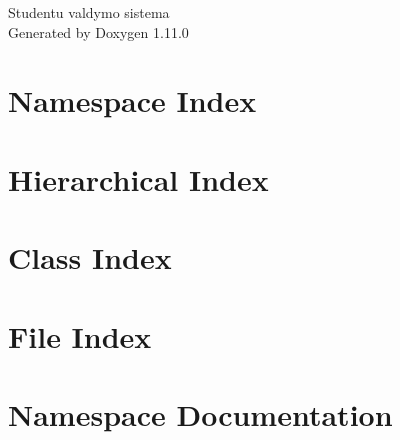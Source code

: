 \documentclass[twoside]{book}
\newcommand{\+}{\discretionary{\mbox{\scriptsize$\hookleftarrow$}}{}{}}
\newcommand{\clearemptydoublepage}{%
    \newpage{\pagestyle{empty}\cleardoublepage}%
  }
\begin{document}
  \raggedbottom
    \hypersetup{pageanchor=false,
                bookmarksnumbered=true,
                pdfencoding=unicode
               }
  \begin{titlepage}
  \vspace*{7cm}
  \begin{center}%
  {\Large Studentu valdymo sistema}\\
  \vspace*{1cm}
  {\large Generated by Doxygen 1.11.0}\\
  \end{center}
  \end{titlepage}
  \clearemptydoublepage
  \tableofcontents
  \clearemptydoublepage
  \hypersetup{pageanchor=true}

\chapter{Namespace Index}

\chapter{Hierarchical Index}

\chapter{Class Index}

\chapter{File Index}

\chapter{Namespace Documentation}















\end{document}
